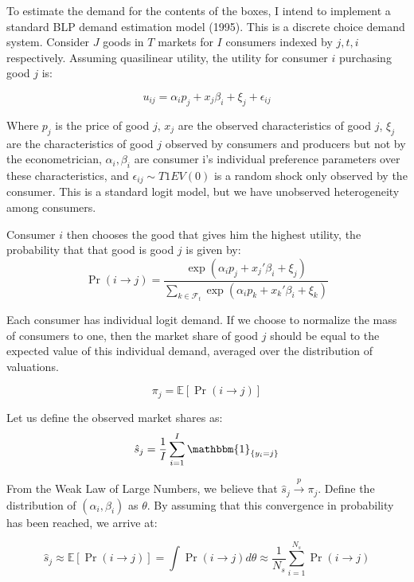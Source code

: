 \documentclass[12pt]{paper}
\newcommand{\plim}{ \overset{p}{\to} }
\newcommand{\exV}[1]{\mathbb{E} \left [ #1 \right ]}
\newcommand{\indicate}[1]{ \mathbbm{1}_{\{#1\}}}
\begin{document}
To estimate the demand for the contents of the boxes, I intend to
implement a standard BLP demand estimation model (1995). This is a discrete
choice demand system. Consider $J$ goods in $T$ markets for $I$
consumers indexed by $j,t,i$ respectively. Assuming quasilinear
utility, the utility for consumer $i$ purchasing good $j$ is:

\begin{equation*}
  u_{ij} = \alpha_i p_j + x_j \beta_i + \xi_j + \epsilon_{ij}
\end{equation*}

Where $p_j$ is the price of good $j$, $x_j$ are the observed
characteristics of good $j$, $\xi_j$ are the characteristics of good
$j$ observed by consumers and producers but not by the econometrician,
$\alpha_i, \beta_i$ are consumer i's individual preference parameters over
these characteristics, and $\epsilon_{ij} \sim T1EV(0)$ is a random shock only
observed by the consumer. This is a standard logit model, but we have
unobserved heterogeneity among consumers.

Consumer $i$ then chooses the good that gives him the highest utility,
the probability that that good is good $j$ is given by:
\begin{equation*}
  \Pr( i \rightarrow j ) = \frac{\exp( \alpha_i p_j + x_j' \beta_i + \xi_j)}{\sum_{k \in
      \mathcal{F}_t} \exp( \alpha_i p_k + x_k' \beta_i + \xi_k)}
\end{equation*}

Each consumer has individual logit demand. If we choose to normalize
the mass of consumers to one, then the market share of good $j$ should
be equal to the expected value of this individual demand, averaged
over the distribution of valuations.

\begin{equation*}
  \pi_j = \exV{ \Pr( i \rightarrow j )}
\end{equation*}

Let us define the observed market shares as:
\begin{equation*}
  \hat{s}_j = \frac{1}{I} \sum_{i = 1}^I \indicate{y_i = j}
\end{equation*}

From the Weak Law of Large Numbers, we believe that $\hat{s}_j \plim
\pi_j$. Define the distribution of $(\alpha_i, \beta_i)$ as $\theta$. By assuming that
this convergence in probability has been reached, we arrive at:

\begin{equation*}
  \hat{s}_j \approx \exV{ \Pr( i \rightarrow j )} = \int \Pr( i \rightarrow j) d\theta \approx \frac{1}{N_s}
  \sum_{i=1}^{N_s} \Pr( i \rightarrow j)
\end{equation*}
\end{document}
